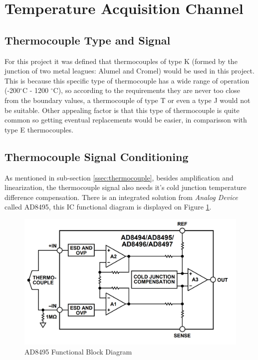 \section{Temperature Acquisition Channel}

	\subsection{Thermocouple Type and Signal}	
			
	 For this project it was defined that thermocouples of type K (formed by the junction of two metal leagues: Alumel and Cromel) would be used in this project. This is because this specific type of thermocouple has a wide range of operation (-200$^{\circ}$C - 1200 $^{\circ}$C), so according to the requirements they are never too close from the boundary values, a thermocouple of type T or even a type J would not be suitable. Other appealing factor is that this type of thermocouple is quite common so getting eventual replacements would be easier, in comparisson with type E thermocouples.

	\subsection{Thermocouple Signal Conditioning}
	
	As mentioned in sub-section \ref{ssec:thermocouple}, besides amplification and linearization, the thermocouple signal also needs it's cold junction temperature difference compensation. There is an integrated solution from \textit{Analog Device} called AD8495, this IC functional diagram is displayed on Figure \ref{fig:ad8495-functional-block}.
	
		\begin{figure}[htbp]
			\centering
				\includegraphics[scale=0.65]{figuras/fig-ad8495-functional-block}
			\caption{AD8495 Functional Block Diagram \cite{ad8495-functional-block}}
			\label{fig:ad8495-functional-block}
		\end{figure}
		
